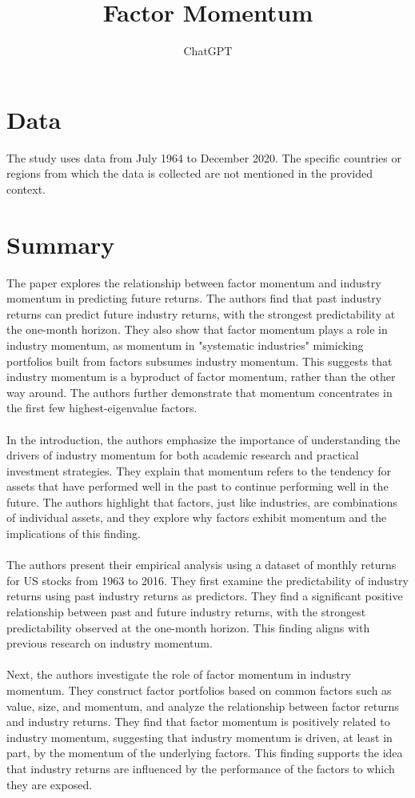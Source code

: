 \documentclass{article}
\title{Factor Momentum}
\author{ChatGPT}
\begin{document}
 

\maketitle
\section{Data}
The study uses data from July 1964 to December 2020. The specific countries or regions from which the data is collected are not mentioned in the provided context. 
\section{Summary}
The paper explores the relationship between factor momentum and industry momentum in predicting future returns. The authors find that past industry returns can predict future industry returns, with the strongest predictability at the one-month horizon. They also show that factor momentum plays a role in industry momentum, as momentum in "systematic industries" mimicking portfolios built from factors subsumes industry momentum. This suggests that industry momentum is a byproduct of factor momentum, rather than the other way around. The authors further demonstrate that momentum concentrates in the first few highest-eigenvalue factors. \\
\\
In the introduction, the authors emphasize the importance of understanding the drivers of industry momentum for both academic research and practical investment strategies. They explain that momentum refers to the tendency for assets that have performed well in the past to continue performing well in the future. The authors highlight that factors, just like industries, are combinations of individual assets, and they explore why factors exhibit momentum and the implications of this finding. \\
\\
The authors present their empirical analysis using a dataset of monthly returns for US stocks from 1963 to 2016. They first examine the predictability of industry returns using past industry returns as predictors. They find a significant positive relationship between past and future industry returns, with the strongest predictability observed at the one-month horizon. This finding aligns with previous research on industry momentum. \\
\\
Next, the authors investigate the role of factor momentum in industry momentum. They construct factor portfolios based on common factors such as value, size, and momentum, and analyze the relationship between factor returns and industry returns. They find that factor momentum is positively related to industry momentum, suggesting that industry momentum is driven, at least in part, by the momentum of the underlying factors. This finding supports the idea that industry returns are influenced by the performance of the factors to which they are exposed. \\
\end{document}
